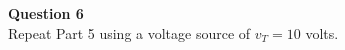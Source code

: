 \documentclass[preview]{standalone}
\begin{document}
\begin{center}
\raggedright
                    \textbf{Question 6}\\
                    Repeat Part 5 using a voltage source of $v_T = 10$ volts.
\end{center}
\end{document}

